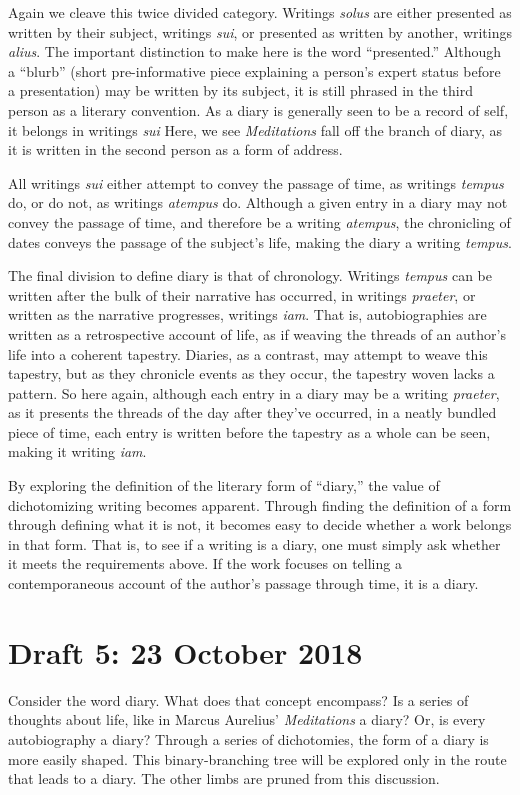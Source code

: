 \documentclass[12pt]{article}[titlepage]
\newcommand{\say}[1]{``#1''}
\newcommand{\1}{\={a}}
\newcommand{\2}{\={e}}
\newcommand{\3}{\={\i}}
\newcommand{\4}{\=o}
\newcommand{\5}{\=u}
\newcommand{\6}{\={A}}
\renewcommand{\,}{\textsuperscript{,}}
\begin{document}
Again we cleave this twice divided category.
Writings \textit{solus} are either presented as written by their subject, writings \textit{sui}, or presented as written by another, writings \textit{alius}.
The important distinction to make here is the word \say{presented.}
Although a \say{blurb} (short pre-informative piece explaining a person's expert status before a presentation) may be written by its subject, it is still phrased in the third person as a literary convention.
As a diary is generally seen to be a record of self, it belongs in writings \textit{sui}
Here, we see \textit{Meditations} fall off the branch of diary, as it is written in the second person as a form of address. 

All writings \textit{sui} either attempt to convey the passage of time, as writings \textit{tempus} do, or do not, as writings \textit{atempus} do.
Although a given entry in a diary may not convey the passage of time, and therefore be a writing \textit{atempus}, the chronicling of dates conveys the passage of the subject's life, making the diary a writing \textit{tempus}.

The final division to define diary is that of chronology.
Writings \textit{tempus} can be written after the bulk of their narrative has occurred, in writings \textit{praeter}, or written as the narrative progresses, writings \textit{iam}.
That is, autobiographies are written as a retrospective account of life, as if weaving the threads of an  author's life into a coherent tapestry.
Diaries, as a contrast, may attempt to weave this tapestry, but as they chronicle events as they occur, the tapestry woven lacks a pattern.
So here again, although each entry in a diary may be a writing \textit{praeter}, as it presents the threads of the day after they've occurred, in a neatly bundled piece of time, each entry is written before the tapestry as a whole can be seen, making it writing \textit{iam}.

By exploring the definition of the literary form of \say{diary,} the value of dichotomizing writing becomes apparent.
Through finding the definition of a form through defining what it is not, it becomes easy to decide whether a work belongs in that form.
That is, to see if a writing is a diary, one must simply ask whether it meets the requirements above.
If the work focuses on telling a contemporaneous account of the author's passage through time, it is a diary.
 
\section{Draft 5: 23 October 2018}
Consider the word diary.
What does that concept encompass?
Is a series of thoughts about life, like in Marcus Aurelius' \textit{Meditations} a diary?
Or, is every autobiography a diary?
Through a series of dichotomies, the form of a diary is more easily shaped. 
This binary-branching tree will be explored only in the route that leads to a diary.
The other limbs are pruned from this discussion.
\end{document}
